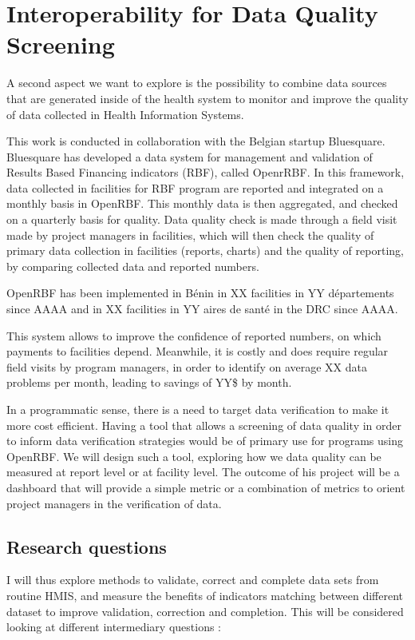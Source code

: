 \section{Interoperability for Data Quality Screening}

A second aspect we want to explore is the possibility to combine data sources that are generated inside of the health system to monitor and improve the quality of data collected in Health Information Systems.

This work is conducted in collaboration with the Belgian startup Bluesquare. Bluesquare has developed a data system for management and validation of Results Based Financing indicators (RBF), called OpenrRBF.  In this framework, data collected in facilities for RBF program are reported and integrated on a monthly basis in OpenRBF. This monthly data is then aggregated, and checked on a quarterly basis for quality. Data quality check is made through a field visit made by project managers in facilities, which will then check the quality of primary data collection in facilities (reports, charts) and the quality of reporting, by comparing collected data and reported numbers.

OpenRBF has been implemented in Bénin in XX facilities in YY départements since AAAA and in XX facilities in YY aires de santé in the DRC since AAAA.

This system allows to improve the confidence of reported numbers, on which payments to facilities depend. Meanwhile, it is costly and does require regular field visits by program managers, in order to identify on average XX data problems per month, leading to savings of YY\$ by month.

In a programmatic sense, there is a need to target data verification to make it more cost efficient. Having a tool that allows a screening of data quality in order to inform data verification strategies would be of primary use for programs using OpenRBF. We will design such a tool, exploring how we data quality can be measured at report level or at facility level. The outcome of his project will be a dashboard that will provide a simple metric or a combination of metrics to orient project managers in the verification of data.

\subsection{Research questions}

I will thus explore methods to validate, correct and complete data sets from routine HMIS, and measure the benefits of indicators matching between different dataset to improve validation, correction and completion. This will be considered looking at different intermediary questions :

